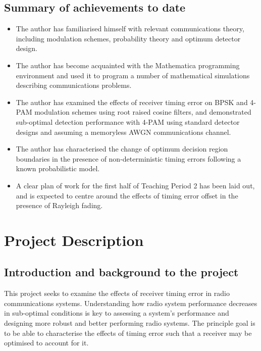\chapter{Summary of achievements to date}

\begin{itemize}
\itemsep1pt\parskip0pt
\item
  The author has familiarised himself with relevant communications
  theory, including modulation schemes, probability theory and optimum
  detector design.
\item
  The author has become acquainted with the Mathematica programming
  environment and used it to program a number of mathematical
  simulations describing communications problems.
\item
  The author has examined the effects of receiver timing error on BPSK
  and 4-PAM modulation schemes using root raised cosine filters, and
  demonstrated sub-optimal detection performance with 4-PAM using
  standard detector designs and assuming a memoryless AWGN communications
  channel.
\item
  The author has characterised the change of optimum decision region
  boundaries in the presence of non-deterministic timing errors
  following a known probabilistic model.
\item
  A clear plan of work for the first half of Teaching Period 2 has been laid out,
  and is expected to centre around the effects of timing error offset in the
  presence of Rayleigh fading.
\end{itemize}


\part{Project Description}

\chapter{Introduction and background to the project}

This project seeks to examine the effects of receiver timing error in
radio communications systems. Understanding how radio system performance
decreases in sub-optimal conditions is key to assessing a system's
performance and designing more robust and better performing radio systems. The
principle goal is to be able to characterise the effects of timing error such
that a receiver may be optimised to account for it.


